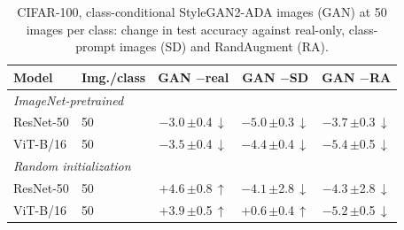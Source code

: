 \begin{table}[htbp]
\centering
\footnotesize
\setlength{\tabcolsep}{4pt}
\caption{CIFAR-100, class-conditional StyleGAN2-ADA images (GAN) at 50 images per class: change in test accuracy against real-only, class-prompt images (SD) and RandAugment (RA).}
\label{tab:paper-gan}
\begin{tabular}{llccc}
\toprule
Model & Img./class & \shortstack{GAN\\$-$real} & \shortstack{GAN\\$-$SD} & \shortstack{GAN\\$-$RA} \\
\midrule
\multicolumn{5}{l}{\textit{ImageNet-pretrained}} \\
ResNet-50 & 50 & $-3.0$\,{\scriptsize$\pm$0.4}\,$\downarrow$ & $-5.0$\,{\scriptsize$\pm$0.3}\,$\downarrow$ & $-3.7$\,{\scriptsize$\pm$0.3}\,$\downarrow$ \\
\addlinespace[2pt]
ViT-B/16 & 50 & $-3.5$\,{\scriptsize$\pm$0.4}\,$\downarrow$ & $-4.4$\,{\scriptsize$\pm$0.4}\,$\downarrow$ & $-5.4$\,{\scriptsize$\pm$0.5}\,$\downarrow$ \\
\midrule
\multicolumn{5}{l}{\textit{Random initialization}} \\
ResNet-50 & 50 & $+4.6$\,{\scriptsize$\pm$0.8}\,$\uparrow$ & $-4.1$\,{\scriptsize$\pm$2.8}\,$\downarrow$ & $-4.3$\,{\scriptsize$\pm$2.8}\,$\downarrow$ \\
\addlinespace[2pt]
ViT-B/16 & 50 & $+3.9$\,{\scriptsize$\pm$0.5}\,$\uparrow$ & $+0.6$\,{\scriptsize$\pm$0.4}\,$\uparrow$ & $-5.2$\,{\scriptsize$\pm$0.5}\,$\downarrow$ \\
\bottomrule
\end{tabular}
\end{table}
